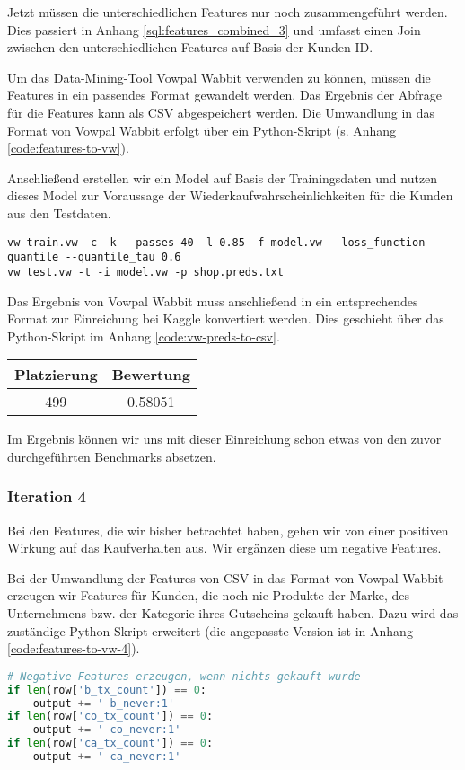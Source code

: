 Jetzt müssen die unterschiedlichen Features nur noch zusammengeführt werden. Dies passiert
in Anhang \ref{sql:features_combined_3} und umfasst einen Join zwischen den
unterschiedlichen Features auf Basis der Kunden-ID.

Um das Data-Mining-Tool Vowpal Wabbit verwenden zu können, müssen die Features in ein
passendes Format gewandelt werden. Das Ergebnis der Abfrage für die Features kann
als CSV abgespeichert werden. Die Umwandlung in das Format von Vowpal Wabbit
erfolgt über ein Python-Skript (s. Anhang \ref{code:features-to-vw}).

Anschließend erstellen wir ein Model auf Basis der Trainingsdaten und nutzen dieses
Model zur Voraussage der Wiederkaufwahrscheinlichkeiten für die Kunden aus den Testdaten.
\begin{lstlisting}
vw train.vw -c -k --passes 40 -l 0.85 -f model.vw --loss_function quantile --quantile_tau 0.6
vw test.vw -t -i model.vw -p shop.preds.txt
\end{lstlisting}

Das Ergebnis von Vowpal Wabbit muss anschließend in ein entsprechendes Format zur Einreichung bei 
Kaggle konvertiert werden. Dies geschieht über das Python-Skript im Anhang 
\ref{code:vw-preds-to-csv}. 

\begin{tabular}{|c|c|}
	\hline \textbf{Platzierung} & \textbf{Bewertung} \\ 
	\hline 499 & 0.58051  \\ 
	\hline 
\end{tabular}

Im Ergebnis können wir uns mit dieser Einreichung
schon etwas von den zuvor durchgeführten Benchmarks absetzen.

\subsubsection{Iteration 4}
Bei den Features, die wir bisher betrachtet haben, gehen wir von einer
positiven Wirkung auf das Kaufverhalten aus. Wir ergänzen diese um negative Features.

Bei der Umwandlung der Features von CSV in das Format von Vowpal Wabbit 
erzeugen wir Features für Kunden, die noch nie Produkte der Marke,
des Unternehmens bzw. der Kategorie ihres Gutscheins gekauft haben.
Dazu wird das zuständige Python-Skript erweitert (die angepasste Version ist in Anhang 
\ref{code:features-to-vw-4}).
\begin{lstlisting}[language=Python]
# Negative Features erzeugen, wenn nichts gekauft wurde
if len(row['b_tx_count']) == 0:
	output += ' b_never:1'
if len(row['co_tx_count']) == 0:
	output += ' co_never:1'
if len(row['ca_tx_count']) == 0:
	output += ' ca_never:1'
\end{lstlisting}

